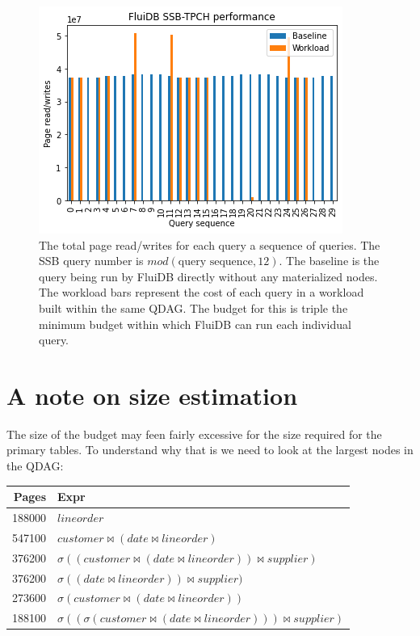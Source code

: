 \begin{figure}[p]
\centering
\includegraphics[width=.9\linewidth]{./imgs/2021-12-03_20-12-36_screenshot.png}

\caption{\label{fig:large_budget_plot}
  The total page read/writes for each query a sequence of queries. The
  SSB query number is \(mod(\text{query sequence},12)\). The baseline
  is the query being run by FluiDB directly without any materialized
  nodes. The workload bars represent the cost of each query in a
  workload built within the same QDAG. The budget for this is triple
  the minimum budget within which FluiDB can run each individual
  query.}
\end{figure}

\section{A note on size estimation}

The size of the budget may feen fairly excessive for the size required
for the primary tables. To understand why that is we need to look at
the largest nodes in the QDAG:

\begin{center}
\begin{tabular}{rl}
Pages & Expr\\
\hline
188000 & \(lineorder\)\\
547100 & \(customer \Join (date \Join lineorder)\)\\
376200 & \(\sigma ((customer \Join (date \Join lineorder)) \Join supplier)\)\\
376200 & \(\sigma ((date \Join lineorder)) \Join supplier)\)\\
273600 & \(\sigma (customer \Join (date \Join lineorder))\)\\
188100 & \(\sigma ((\sigma (customer \Join (date \Join lineorder))) \Join supplier)\)\\
\end{tabular}
\end{center}

